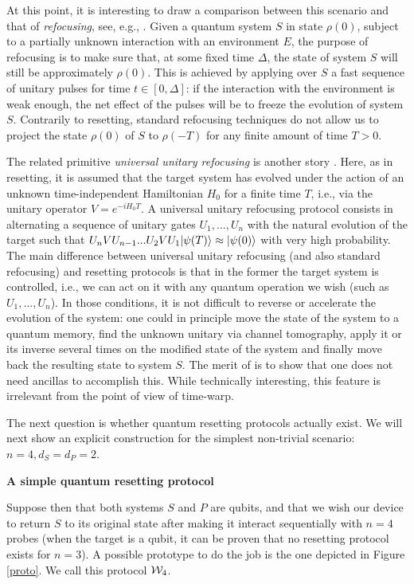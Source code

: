 \documentclass[twocolumn,prx,aps,longbibliography]{revtex4-1}
\begin{document}
At this point, it is interesting to draw a comparison between this scenario and that of \emph{refocusing}, see, e.g., \cite{spinEcho, dynamicalDecoupling}. Given a quantum system $S$ in state $\rho(0)$, subject to a partially unknown interaction with an environment $E$, the purpose of refocusing is to make sure that, at some fixed time $\Delta$, the state of system $S$ will still be approximately $\rho(0)$. This is achieved by applying over $S$ a fast sequence of unitary pulses for time $t\in [0,\Delta]$: if the interaction with the environment is weak enough, the net effect of the pulses will be to freeze the evolution of system $S$. Contrarily to resetting, standard refocusing techniques do not allow us to project the state $\rho(0)$ of $S$ to $\rho(-T)$ for any finite amount of time $T>0$. 

The related primitive \emph{universal unitary refocusing} is another story \cite{refocusing}. Here, as in resetting, it is assumed that the target system has evolved under the action of an unknown time-independent Hamiltonian $H_0$ for a finite time $T$, i.e., via the unitary operator $V=e^{-iH_0T}$. A universal unitary refocusing protocol consists in alternating a sequence of unitary gates $U_1,...,U_n$ with the natural evolution of the target such that $U_nVU_{n-1}...U_2VU_1 |\psi(T)\rangle\approx |\psi(0)\rangle$ with very high probability. The main difference between universal unitary refocusing (and also standard refocusing) and resetting protocols is that in the former the target system is controlled, i.e., we can act on it with any quantum operation we wish (such as $U_1,...,U_n$). In those conditions, it is not difficult to reverse or accelerate the evolution of the system: one could in principle move the state of the system to a quantum memory, find the unknown unitary via channel tomography, apply it or its inverse several times on the modified state of the system and finally move back the resulting state to system $S$. The merit of \cite{refocusing} is to show that one does not need ancillas to accomplish this. While technically interesting, this feature is irrelevant from the point of view of time-warp.


The next question is whether quantum resetting protocols actually exist. We will next show an explicit construction for the simplest non-trivial scenario: $n=4, d_S=d_P=2$.

\vspace{10pt}
\noindent\textbf{A simple quantum resetting protocol}

Suppose then that both systems $S$ and $P$ are qubits, and that we wish our device to return $S$ to its original state after making it interact sequentially with $n=4$ probes (when the target is a qubit, it can be proven that no resetting protocol exists for $n=3$). A possible prototype to do the job is the one depicted in Figure \ref{proto}. We call this protocol ${\cal W}_4$.
\end{document}
